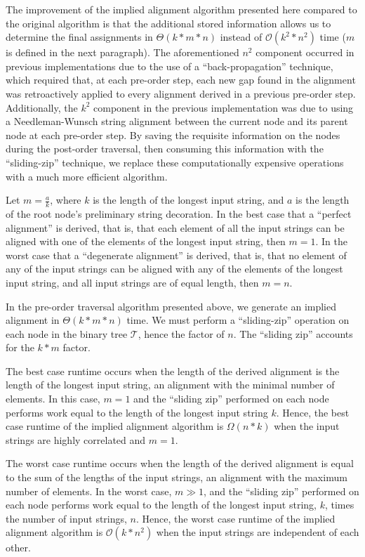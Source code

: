 \documentclass{bmcart}
\begin{document}
The improvement of the implied alignment algorithm presented here compared to the original algorithm is that the additional stored information allows us to determine the final assignments in $\Theta(k * m * n)$ instead of $\mathcal{O}(k^2 * n^2)$ time ($m$ is defined in the next paragraph). 
The aforementioned $n^2$ component occurred in previous implementations due to the use of a ``back-propagation'' technique, which required that, at each pre-order step, each new gap found in the alignment was retroactively applied to every alignment derived in a previous pre-order step.
Additionally, the $k^2$ component in the previous implementation was due to using a Needleman-Wunsch string alignment between the current node and its parent node at each pre-order step.
By saving the requisite information on the nodes during the post-order traversal, then consuming this information with the ``sliding-zip'' technique, we replace these computationally expensive operations with a much more efficient algorithm.

Let $m = \frac{a}{k}$, where $k$ is the length of the longest input string, and $a$ is the length of the root node's preliminary string decoration.
In the best case that a ``perfect alignment'' is derived, that is, that each element of all the input strings can be aligned with one of the elements of the longest input string, then $m = 1$.
In the worst case that a ``degenerate alignment'' is derived, that is, that no element of any of the input strings can be aligned with any of the elements of the longest input string, and all input strings are of equal length, then $m = n$.

In the pre-order traversal algorithm presented above, we generate an implied alignment in $\Theta(k * m * n)$ time.
We must perform a ``sliding-zip'' operation on each node in the binary tree $\mathcal{T}$, hence the factor of $n$.
The ``sliding zip'' accounts for the $k * m$ factor.

The best case runtime occurs when the length of the derived alignment is the length of the longest input string, an alignment with the minimal number of elements.
In this case, $m = 1$ and the ``sliding zip'' performed on each node performs work equal to the length of the longest input string $k$.
Hence, the best case runtime of the implied alignment algorithm is $\Omega(n*k)$ when the input strings are highly correlated and $m = 1$.

The worst case runtime occurs when the length of the derived alignment is equal to the sum of the lengths of the input strings, an alignment with the maximum number of elements.
In the worst case, $m \gg 1$, and the ``sliding zip'' performed on each node performs work equal to the length of the longest input string, $k$, times the number of input strings, $n$.
Hence, the worst case runtime of the implied alignment algorithm is $\mathcal{O}(k * n^2)$ when the input strings are independent of each other.
\end{document}
